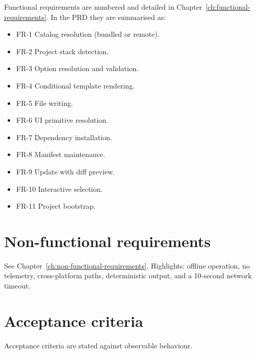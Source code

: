 Functional requirements are numbered and detailed in
Chapter~\ref{ch:functional-requirements}. In the PRD they are summarised as:

\begin{itemize}
  \item FR-1 Catalog resolution (bundled or remote).
  \item FR-2 Project stack detection.
  \item FR-3 Option resolution and validation.
  \item FR-4 Conditional template rendering.
  \item FR-5 File writing.
  \item FR-6 UI primitive resolution.
  \item FR-7 Dependency installation.
  \item FR-8 Manifest maintenance.
  \item FR-9 Update with diff preview.
  \item FR-10 Interactive selection.
  \item FR-11 Project bootstrap.
\end{itemize}

\section{Non-functional requirements}

See Chapter~\ref{ch:non-functional-requirements}. Highlights: offline operation,
no telemetry, cross-platform paths, deterministic output, and a 10-second network
timeout.

\section{Acceptance criteria}

Acceptance criteria are stated against observable behaviour.

